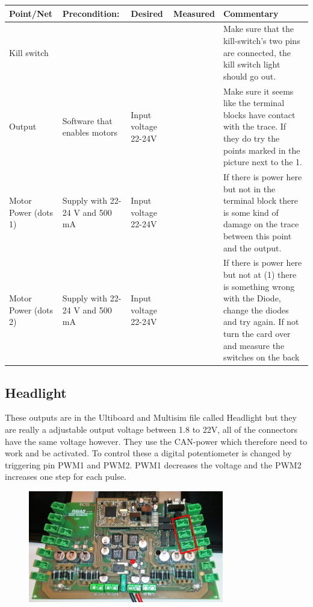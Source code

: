 \begin{table}[ht]
\begin{tabularx}{\textwidth}{|>{\hsize=0.6\hsize}X|>{\hsize=0.8\hsize}X|>{\hsize=0.8\hsize}X|c|>{\hsize=1.8\hsize}X|}
\hline 
 Point/Net & Precondition: & Desired & Measured & Commentary \\ 
\hline
Kill switch &  &  &  & Make sure that the kill-switch's two pins are connected, the kill switch light should go out. \\ 
\hline
Output & Software that enables motors & Input voltage 22-24V &   & Make sure it seems like the terminal blocks have contact with the trace. If they do try the points marked in the picture next to the 1. \\ 
\hline 
Motor Power (dots 1) & Supply with 22-24 V and 500 mA & Input voltage 22-24V &    & If there is power here but not in the terminal block there is some kind of damage on the trace between this point and the output. \\ 
\hline 
Motor Power (dots 2) & Supply with 22-24 V and 500 mA  & Input voltage 22-24V &   & If there is power here but not at (1) there is something wrong with the Diode, change the diodes and try again. 
If not turn the card over and measure the switches on the back \\ 
\hline 
\end{tabularx}
\end{table}

\newpage
\subsection{Headlight}
These outputs are in the Ultiboard and Multisim file called Headlight but they are really a adjustable output voltage between 1.8 to 22V, all of the connectors have the same voltage however. They use the CAN-power which therefore need to work and be activated. To control these a digital potentiometer is changed by triggering pin PWM1 and PWM2. PWM1 decreases the voltage and the PWM2 increases one step for each pulse. 
\begin{figure}[!ht]
	\begin{center}
		\includegraphics[width=0.76\textwidth]{./Images/Unit_test_power_board/headlight.jpg}
		\label{motor_pwr}
	\end{center}
\end{figure}

